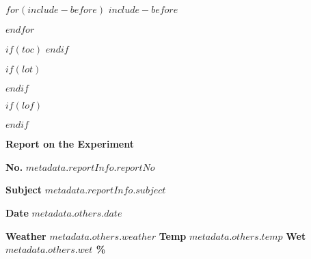\documentclass[9pt,a4paper,$if(lang)$$babel-lang$,$endif$]{ltjsarticle}
\begin{document}

$for(include-before)$
$include-before$

$endfor$

$if(toc)$
{
\hypersetup{linkcolor=$if(toccolor)$$toccolor$$else$black$endif$}
\setcounter{tocdepth}{$toc-depth$}
\tableofcontents
}
$endif$

$if(lot)$
\listoftables
$endif$

$if(lof)$
\listoffigures
$endif$

\newenvironment{boldtabular}{ \arrayrulewidth = 2pt }{}
\newenvironment{narrowtabular}{ \renewcommand{\arraystretch}{0.8} }{}
\newenvironment{titletabular}{ \renewcommand{\arraystretch}{1.1} }{}
\newenvironment{datetabular}{ \renewcommand{\arraystretch}{1.1} }{}
\newenvironment{templaturetabular}{ \renewcommand{\arraystretch}{1.18} }{}
\newenvironment{report-title}{
\centering
  \fontsize{20pt}{20pt}\selectfont
}{}
\fontsize{14pt}{28pt}\selectfont

\begin{center}
  \begin{report-title}
    \textbf{Report on the Experiment}
  \end{report-title}

  \vspace{10mm}

  \textbf{No.} \textbf{$metadata.reportInfo.reportNo$}\\

  \vspace{10mm}

  \textbf{Subject} \textbf{$metadata.reportInfo.subject$}\\

  \vspace{10mm}

  \textbf{Date} \textbf{$metadata.others.date$}\\

  \vspace{10mm}

  \textbf{Weather} \textbf{    $metadata.others.weather$    }
  \textbf{Temp} \textbf{    $metadata.others.temp$ \celsius    }
  \textbf{Wet} \textbf{    $metadata.others.wet$ \%    }
\end{center}
\end{document}
